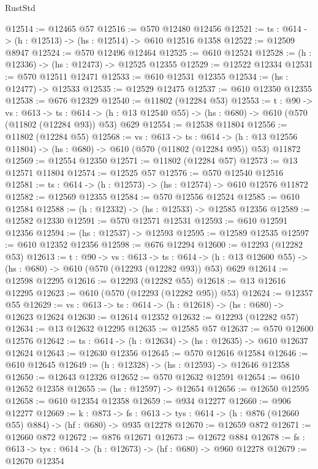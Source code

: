 \begin{lexlean}{RustStd}
\begin{coremodule}
@12514 := @12465 @57
@12516 := @570 @12480 @12456
@12521 := {ts : @614} -> (h : @12513) -> (hs : @12514) -> @610 @12516 @1358
@12522 := @12509 @8947
@12524 := @570 @12496 @12464
@12525 := @610 @12524
@12528 := (h : @12336) -> (hs : @12473) -> @12525 @12355
@12529 := @12522 @12334
@12531 := @570 @12511 @12471
@12533 := @610 @12531 @12355
@12534 := (hs : @12477) -> @12533
@12535 := @12529 @12475
@12537 := @610 @12350 @12355
@12538 := @676 @12329
@12540 := @11802 (@12284 @53)
@12553 := {t : @90} ->
  {vs : @613} ->
  {ts : @614} -> (h : @13 @12540 @55) -> (hs : @680) -> @610 (@570 (@11802 (@12284 @93)) @53) @629
@12554 := @12538 @11804
@12556 := @11802 (@12284 @55)
@12568 := {vs : @613} ->
  {ts : @614} ->
  (h : @13 @12556 @11804) -> (hs : @680) -> @610 (@570 (@11802 (@12284 @95)) @53) @11872
@12569 := @12554 @12350
@12571 := @11802 (@12284 @57)
@12573 := @13 @12571 @11804
@12574 := @12525 @57
@12576 := @570 @12540 @12516
@12581 := {ts : @614} -> (h : @12573) -> (hs : @12574) -> @610 @12576 @11872
@12582 := @12569 @12355
@12584 := @570 @12556 @12524
@12585 := @610 @12584
@12588 := (h : @12332) -> (hs : @12533) -> @12585 @12356
@12589 := @12582 @12330
@12591 := @570 @12571 @12531
@12593 := @610 @12591 @12356
@12594 := (hs : @12537) -> @12593
@12595 := @12589 @12535
@12597 := @610 @12352 @12356
@12598 := @676 @12294
@12600 := @12293 (@12282 @53)
@12613 := {t : @90} ->
  {vs : @613} ->
  {ts : @614} -> (h : @13 @12600 @55) -> (hs : @680) -> @610 (@570 (@12293 (@12282 @93)) @53) @629
@12614 := @12598 @12295
@12616 := @12293 (@12282 @55)
@12618 := @13 @12616 @12295
@12623 := @610 (@570 (@12293 (@12282 @95)) @53)
@12624 := @12357 @55
@12629 := {vs : @613} -> {ts : @614} -> (h : @12618) -> (hs : @680) -> @12623 @12624
@12630 := @12614 @12352
@12632 := @12293 (@12282 @57)
@12634 := @13 @12632 @12295
@12635 := @12585 @57
@12637 := @570 @12600 @12576
@12642 := {ts : @614} -> (h : @12634) -> (hs : @12635) -> @610 @12637 @12624
@12643 := @12630 @12356
@12645 := @570 @12616 @12584
@12646 := @610 @12645
@12649 := (h : @12328) -> (hs : @12593) -> @12646 @12358
@12650 := @12643 @12326
@12652 := @570 @12632 @12591
@12654 := @610 @12652 @12358
@12655 := (hs : @12597) -> @12654
@12656 := @12650 @12595
@12658 := @610 @12354 @12358
@12659 := @934 @12277
@12660 := @906 @12277
@12669 := {k : @873} ->
  {fs : @613} -> {tys : @614} -> (h : @876 (@12660 @55) @884) -> (hf : @680) -> @935 @12278
@12670 := @12659 @872
@12671 := @12660 @872
@12672 := @876 @12671
@12673 := @12672 @884
@12678 := {fs : @613} -> {tys : @614} -> (h : @12673) -> (hf : @680) -> @960 @12278
@12679 := @12670 @12354

\end{coremodule}
\end{lexlean}
